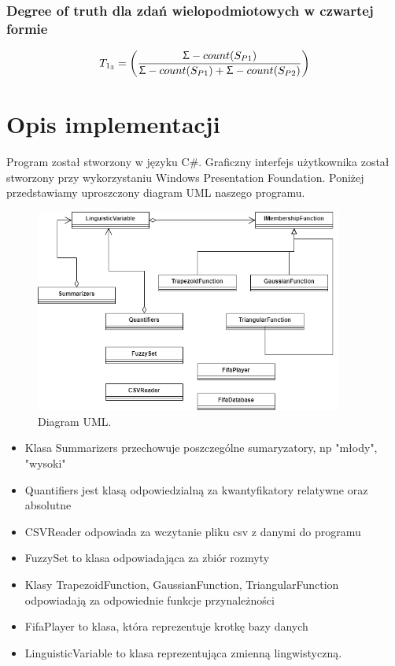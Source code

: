 \documentclass{classrep}
\begin{document}
\subsubsection{Degree of truth dla zdań wielopodmiotowych w czwartej formie \cite{anarticle30}} 
\begin{equation}
T_{1_3} = \left(\frac{\Upsigma-count(S_{P1})}
			{\Upsigma-count(S_{P1}) + \Upsigma-count(S_{P2})}\right)
\end{equation}


	\newpage
	\section{Opis implementacji} %
	Program został stworzony w języku C\#. Graficzny interfejs użytkownika został stworzony przy wykorzystaniu Windows Presentation Foundation. Poniżej przedstawiamy uproszczony diagram UML naszego programu.
	
	\begin{figure}[h!]
		\centering
		\includegraphics[width=0.9\textwidth]{../uml/uml.png}
		\caption{Diagram UML.}
		\label{uml}
	\end{figure}
	
	\begin{itemize}
		\item Klasa Summarizers przechowuje poszczególne sumaryzatory, np "młody", "wysoki" 
		\item Quantifiers jest klasą odpowiedzialną za kwantyfikatory relatywne oraz absolutne
		\item CSVReader odpowiada za wczytanie pliku csv z danymi do programu
		\item FuzzySet to klasa odpowiadająca za zbiór rozmyty
		\item Klasy TrapezoidFunction, GaussianFunction, TriangularFunction odpowiadają za odpowiednie funkcje przynależności
		\item FifaPlayer to klasa, która reprezentuje krotkę bazy danych
		\item LinguisticVariable to klasa reprezentująca zmienną lingwistyczną.
	\end{itemize}
	
\end{document}
